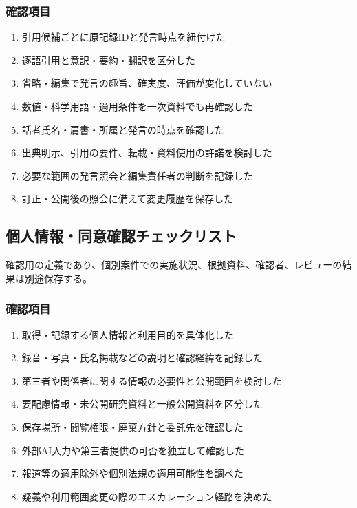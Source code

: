 \documentclass[a4paper,11pt]{article}
\begin{document}
\subsubsection*{確認項目}
\begin{enumerate}[leftmargin=2em,itemsep=0.3em]
\item 引用候補ごとに原記録IDと発言時点を紐付けた\par
\item 逐語引用と意訳・要約・翻訳を区分した\par
\item 省略・編集で発言の趣旨、確実度、評価が変化していない\par
\item 数値・科学用語・適用条件を一次資料でも再確認した\par
\item 話者氏名・肩書・所属と発言の時点を確認した\par
\item 出典明示、引用の要件、転載・資料使用の許諾を検討した\par
\item 必要な範囲の発言照会と編集責任者の判断を記録した\par
\item 訂正・公開後の照会に備えて変更履歴を保存した\par
\end{enumerate}
\subsection{個人情報・同意確認チェックリスト}
\par 確認用の定義であり、個別案件での実施状況、根拠資料、確認者、レビューの結果は別途保存する。\par\medskip
\subsubsection*{確認項目}
\begin{enumerate}[leftmargin=2em,itemsep=0.3em]
\item 取得・記録する個人情報と利用目的を具体化した\par
\item 録音・写真・氏名掲載などの説明と確認経緯を記録した\par
\item 第三者や関係者に関する情報の必要性と公開範囲を検討した\par
\item 要配慮情報・未公開研究資料と一般公開資料を区分した\par
\item 保存場所・閲覧権限・廃棄方針と委託先を確認した\par
\item 外部AI入力や第三者提供の可否を独立して確認した\par
\item 報道等の適用除外や個別法規の適用可能性を調べた\par
\item 疑義や利用範囲変更の際のエスカレーション経路を決めた\par
\end{enumerate}
\end{document}
